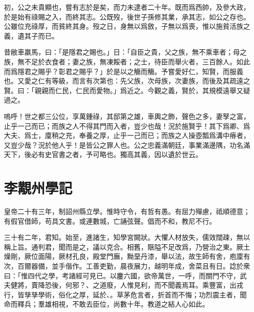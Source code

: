 初，公之未貴顯也，嘗有志於是矣，而力未逮者二十年。既而爲西帥，及參大政，於是始有祿賜之入，而終其志。公既歿，後世子孫修其業，承其志，如公之存也。公雖位充祿厚，而貧終其身。歿之日，身無以爲斂，子無以爲喪，惟以施貧活族之義，遺其子而已。

昔敝車羸馬，曰：「是隱君之賜也。」日：「自臣之貴，父之族，無不乘車者；母之族，無不足於衣食者；妻之族，無凍餒者；之士，待臣而舉火者，三百餘人。如此而爲隱君之賜乎？彰君之賜乎？」於是以之觴而觴。予嘗愛好仁，知賢，而服義也。又愛之仁有等級，而言有次第也：先父族，次母族，次妻族，而後及其疏遠之賢。曰：「親親而仁民，仁民而愛物。」爲近之。今觀之義，賢於，其規模遠舉又疑過之。

嗚呼！世之都三公位，享萬鍾祿，其邸第之雄，車輿之飾，聲色之多，妻孥之富，止乎一己而已；而族之人不得其門{而入}者，豈少也哉！況於施賢乎！其下爲卿、爲大夫、爲士，廩稍之充，奉養之厚，止乎一己而已；而族之人操壺瓢爲溝中瘠者，又豈少哉？況於{他}人乎！是皆公之罪人也。公之忠義滿朝廷，事業滿邊隅，功名滿天下，後必有史官書之者，予可{略}也。獨高其義，因以遺於世云。 %

\theendnotes

\section[袁州州學記\quad{\small 李覯}]{{\normalsize 李覯}\quad {}州學記}
皇帝二十有三年，制詔州縣立學。惟時守令，有哲有愚。有屈力殫慮，祗順德意；有假官借師，苟具文書。或連數城，亡誦弦聲。倡而不和，教尼不行。

三十有二年，君知。始至，進諸生，知學宮闕狀。大懼人材放失，儒效闊疎，無以稱上旨。通判君，聞而是之，議以克合。相舊，陿隘不足改爲，乃營治之東。厥土燥剛，厥位面陽，厥材孔良，殿堂門廡，黝堊丹漆，舉以法，故生師有舍，庖廩有次，百爾器備，並手偕作。工善吏勤，晨夜展力，越明年成，舍菜且有日。諗於衆曰：「惟四代之學，考諸經可見已。以鏖六國，欲帝萬世，一呼，而關門不守，武夫健將，賣降恐後，何邪？、之道廢，人惟見利，而不聞義焉耳。乘豐富，出戎行，皆孳孳學術，俗化之厚，延於、。草茅危言者，折首而不悔；功烈震主者，聞命而釋兵；羣雄相視，不敢去臣位，尚數十年。教道之結人心如此。%

